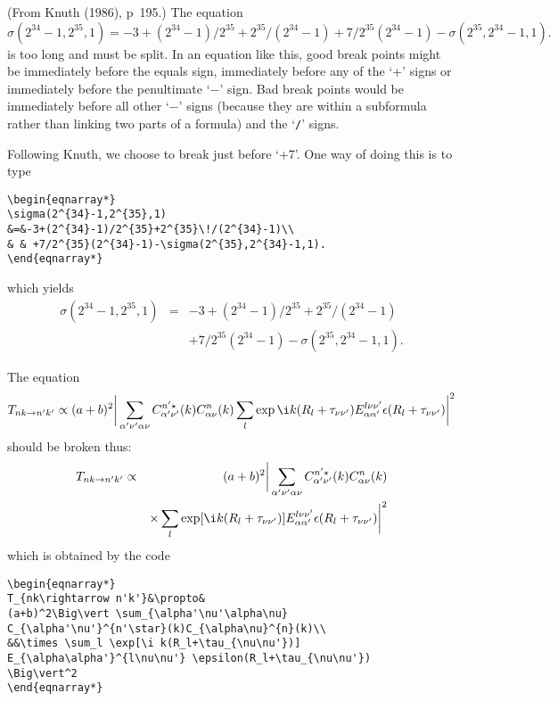 \begin{example} (From Knuth (1986), p~195.)
The equation
\[
\sigma(2^{34}-1,2^{35},1)
=
-3+(2^{34}-1)/2^{35}+2^{35}\!/(2^{34}-1)
+7/2^{35}(2^{34}-1)-\sigma(2^{35},2^{34}-1,1).
\]
is too long and must be split. In an equation like this, good break 
points might be immediately before the equals sign, immediately 
before any of the `+' signs or immediately before the penultimate `$-$' 
sign. Bad break points would be immediately before all other `$-$' signs 
(because they are within a subformula rather than linking two parts of 
a formula) and the `\verb"/"' signs.

Following Knuth, we choose to break just before `+7'. One way of doing 
this is to type
\begin{verbatim}
\begin{eqnarray*}
\sigma(2^{34}-1,2^{35},1)
&=&-3+(2^{34}-1)/2^{35}+2^{35}\!/(2^{34}-1)\\
& & +7/2^{35}(2^{34}-1)-\sigma(2^{35},2^{34}-1,1).
\end{eqnarray*}
\end{verbatim}
which yields
\begin{eqnarray*}
\sigma(2^{34}-1,2^{35},1)
&=&-3+(2^{34}-1)/2^{35}+2^{35}\!/(2^{34}-1)\\
& &+7/2^{35}(2^{34}-1)-\sigma(2^{35},2^{34}-1,1).
\end{eqnarray*}
\end{example}


\begin{example} The equation
\[
T_{nk\rightarrow n'k'} \propto (a+b)^2
\bigg\vert \sum_{\alpha'\nu'\alpha\nu} C_{\alpha'\nu'}^{n'\star}(k)
C_{\alpha\nu}^{n}(k)\sum_l \exp{\i k(R_l+\tau_{\nu\nu'})} 
E_{\alpha\alpha'}^{l\nu\nu'} \epsilon(R_l+\tau_{\nu\nu'}) \bigg\vert^2
\]
should be broken thus:
\begin{eqnarray*}
T_{nk\rightarrow n'k'}&\propto& 
(a+b)^2\bigg\vert \sum_{\alpha'\nu'\alpha\nu} 
C_{\alpha'\nu'}^{n'\star}(k)C_{\alpha\nu}^{n}(k)\\
&&\times \sum_l \exp[\i k(R_l+\tau_{\nu\nu'})] 
E_{\alpha\alpha'}^{l\nu\nu'} \epsilon(R_l+\tau_{\nu\nu'}) 
\bigg\vert^2
\end{eqnarray*}
which is obtained by the code
\begin{verbatim}
\begin{eqnarray*} 
T_{nk\rightarrow n'k'}&\propto& 
(a+b)^2\Big\vert \sum_{\alpha'\nu'\alpha\nu} 
C_{\alpha'\nu'}^{n'\star}(k)C_{\alpha\nu}^{n}(k)\\
&&\times \sum_l \exp[\i k(R_l+\tau_{\nu\nu'})] 
E_{\alpha\alpha'}^{l\nu\nu'} \epsilon(R_l+\tau_{\nu\nu'}) 
\Big\vert^2
\end{eqnarray*}
\end{verbatim}
\end{example}


